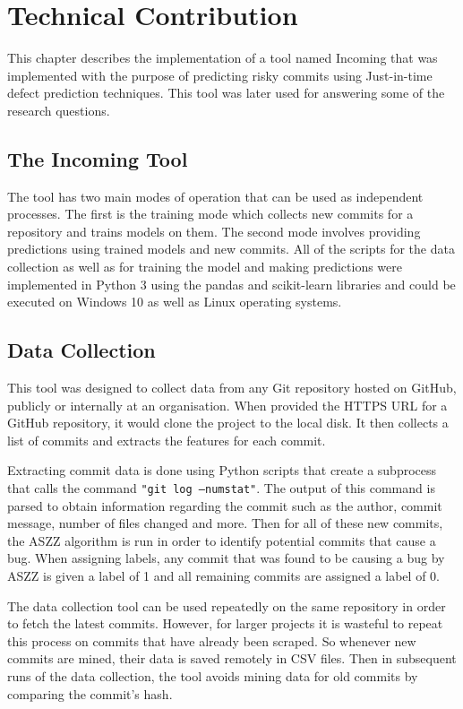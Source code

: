 \documentclass[../main.tex]{subfiles}
\begin{document}
\chapter{Technical Contribution}\label{chapter:technical_contribution}

This chapter describes the implementation of a tool named Incoming that was implemented with the purpose of predicting risky commits using Just-in-time defect prediction techniques. This tool was later used for answering some of the research questions. 

\section{The Incoming Tool}

The tool has two main modes of operation that can be used as independent processes. The first is the training mode which collects new commits for a repository and trains models on them. The second mode involves providing predictions using trained models and new commits. All of the scripts for the data collection as well as for training the model and making predictions were implemented in Python 3 using the pandas and scikit-learn libraries and could be executed on Windows 10 as well as Linux operating systems. 

\section{Data Collection}

This tool was designed to collect data from any Git repository hosted on GitHub, publicly or internally at an organisation. When provided the HTTPS URL for a GitHub repository, it would clone the project to the local disk. It then collects a list of commits and extracts the features for each commit. 

Extracting commit data is done using Python scripts that create a subprocess that calls the command \texttt{"git log --numstat"}. The output of this command is parsed to obtain information regarding the commit such as the author, commit message, number of files changed and more. Then for all of these new commits, the ASZZ algorithm is run in order to identify potential commits that cause a bug. When assigning labels, any commit that was found to be causing a bug by ASZZ is given a label of 1 and all remaining commits are assigned a label of 0. 

The data collection tool can be used repeatedly on the same repository in order to fetch the latest commits. However, for larger projects it is wasteful to repeat this process on commits that have already been scraped. So whenever new commits are mined, their data is saved remotely in CSV files. Then in subsequent runs of the data collection, the tool avoids mining data for old commits by comparing the commit's hash. 
\end{document}
